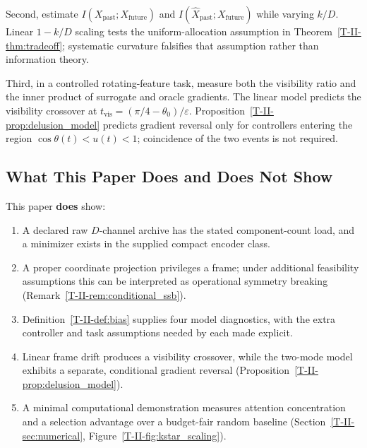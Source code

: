 \documentclass[12pt,a4paper,openany]{book}
\begin{document}
Second, estimate
$I(X_{\mathrm{past}};X_{\mathrm{future}})$ and
$I(\hat X_{\mathrm{past}};X_{\mathrm{future}})$ while varying $k/D$.
Linear $1-k/D$ scaling tests the uniform-allocation assumption in
Theorem~\ref{T-II-thm:tradeoff}; systematic curvature falsifies that
assumption rather than information theory.

Third, in a controlled rotating-feature task, measure both the visibility
ratio and the inner product of surrogate and oracle gradients.  The
linear model predicts the visibility crossover at
$t_{\mathrm{vis}}=(\pi/4-\theta_0)/\varepsilon$.  Proposition~\ref{T-II-prop:delusion_model}
predicts gradient reversal only for controllers entering the region
$\cos\theta(t)<u(t)<1$; coincidence of the two events is not required.

\subsection{What This Paper Does and Does Not Show}
\label{T-II-subsec:claims}

This paper \textbf{does} show:
\begin{enumerate}
\item A declared raw $D$-channel archive has the stated component-count
  load, and a minimizer exists in the supplied compact encoder class.
\item A proper coordinate projection privileges a frame; under additional
  feasibility assumptions this can be interpreted as operational symmetry
  breaking (Remark~\ref{T-II-rem:conditional_ssb}).
\item Definition~\ref{T-II-def:bias} supplies four model diagnostics, with the
  extra controller and task assumptions needed by each made explicit.
\item Linear frame drift produces a visibility crossover, while the
  two-mode model exhibits a separate, conditional gradient reversal
  (Proposition~\ref{T-II-prop:delusion_model}).
\item A minimal computational demonstration measures attention
  concentration and a selection advantage over a budget-fair random baseline
  (Section~\ref{T-II-sec:numerical},
  Figure~\ref{T-II-fig:kstar_scaling}).
\end{enumerate}
\end{document}
